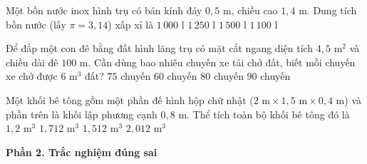 \begin{ex} %
Một bồn nước inox hình trụ có bán kính đáy $0{,}5\text{ m}$, chiều cao $1{,}4\text{ m}$. Dung tích bồn nước (lấy $\pi = 3{,}14$) xấp xỉ là
\choice
{$1\,000\text{ l}$}
{$1\,250\text{ l}$}
{$1\,500\text{ l}$}
{\True $1\,100\text{ l}$}
\end{ex}

\begin{ex} %
Để đắp một con đê bằng đất hình lăng trụ có mặt cắt ngang diện tích $4{,}5\text{ m}^2$ và chiều dài đê $100\text{ m}$. Cần dùng bao nhiêu chuyến xe tải chở đất, biết mỗi chuyến xe chở được $6\text{ m}^3$ đất?
\choice
{\True $75$ chuyến}
{$60$ chuyến}
{$80$ chuyến}
{$90$ chuyến}
\end{ex}

\begin{ex} %
Một khối bê tông gồm một phần đế hình hộp chữ nhật ($2\text{ m} \times 1{,}5\text{ m} \times 0{,}4\text{ m}$) và phần trên là khối lập phương cạnh $0{,}8\text{ m}$. Thể tích toàn bộ khối bê tông đó là
\choice
{$1{,}2\text{ m}^3$}
{\True $1{,}712\text{ m}^3$}
{$1{,}512\text{ m}^3$}
{$2{,}012\text{ m}^3$}
\end{ex}

\textbf{Phần 2. Trắc nghiệm đúng sai}

